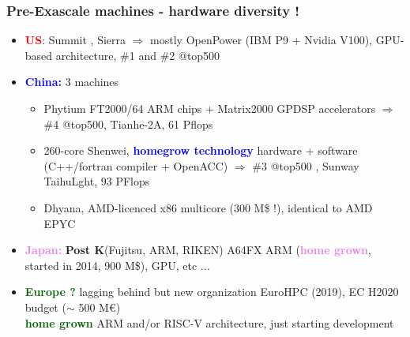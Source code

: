 \begin{frame}
  \frametitle{Pre-Exascale machines - hardware diversity !}
  
  \begin{itemize}
  \item \textcolor{red}{\bf \large US}: Summit , Sierra $\Rightarrow$ mostly OpenPower (IBM P9 + Nvidia V100), GPU-based architecture, \#1 and \#2 @top500
  \item \textcolor{blue}{\bf \large China:} 3 machines %
    \begin{itemize}
    \item Phytium FT2000/64 ARM chips + Matrix2000 GPDSP accelerators $\Rightarrow$ \#4 @top500, Tianhe-2A, 61 Pflops
    \item 260-core Shenwei, \textcolor{blue}{\bf homegrow technology} hardware + software (C++/fortran compiler + OpenACC) $\Rightarrow$ \#3 @top500 , Sunway TaihuLght, 93 PFlops
    \item Dhyana, AMD-licenced x86 multicore (300 M\$ !), identical to AMD EPYC
    \end{itemize}
    
  \item \textcolor{violet}{\bf \large Japan:} {\bf Post K}(Fujitsu, ARM, RIKEN)  A64FX ARM (\textcolor{violet}{\bf home grown}, started in 2014, 900 M\$), GPU, etc ...
  \item \textcolor{darkgreen}{\bf \large Europe ?} lagging behind but new organization EuroHPC (2019), EC H2020 budget ($\sim$ 500 M\euro)\\
    \textcolor{darkgreen}{\bf home grown} ARM and/or RISC-V architecture, just starting development
  \end{itemize}

  
\end{frame}


